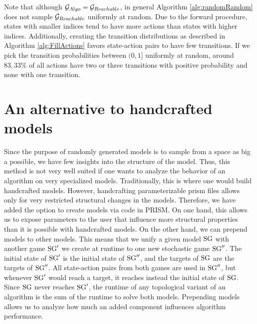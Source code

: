 Note that although $\mathcal{G}_{Algo} = \mathcal{G}_{Reachable}$, in general Algorithm \ref{alg:randomRandom} does not sample $\mathcal{G}_{Reachable}$ uniformly at random.
Due to the forward procedure, states with smaller indices tend to have more actions than states with higher indices.
Additionally, creating the transition distributions as described in Algorithm \ref{alg:FillActions} favors state-action pairs to have few transitions.
If we pick the transition probabilities between $(0, 1]$ uniformly at random, around $83,33\%$ of all actions have two or three transitions with positive probability and 
none with one transition.

\section{An alternative to handcrafted models} \label{sec:configs}
Since the purpose of randomly generated models is to sample from a space as big a possible, we have few insights into the structure of the model.
Thus, this method is not very well suited if one wants to analyze the behavior of an algorithm on very specialized models. 
Traditionally, this is where one would build handcrafted models. 
However, handcrafting parameterizable prism files allows only for very restricted structural changes in the models. 
Therefore, we have added the option to create models via code in PRISM. 
On one hand, this allows us to expose parameters to the user that influence more structural properties than it is possible with handcrafted models.
On the other hand, we can prepend models to other models.
This means that we unify a given model $\textrm{SG}$ with another game $\textrm{SG}'$ we create at runtime to one new stochastic game $\textrm{SG}''$.
The initial state of $\textrm{SG}'$ is the initial state of $\textrm{SG}''$, and the targets of $\textrm{SG}$ are the targets of $\textrm{SG}''$.
All state-action pairs from both games are used in $\textrm{SG}''$, but whenever $\textrm{SG}'$ would reach a target, it reaches instead the initial state of $\textrm{SG}$.
Since $\textrm{SG}$ never reaches $\textrm{SG}'$, the runtime of any topological variant of an algorithm is the sum of the runtime to solve both models.
Prepending models allows us to analyze how much an added component influences algorithm performance.






